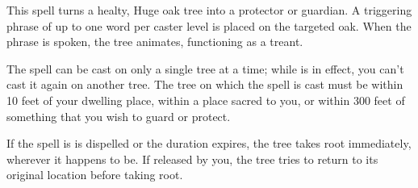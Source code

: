 \begin{spelleffect}
This spell turns a healty, Huge oak tree into a protector or guardian. A triggering phrase of up to one word per caster level is placed on the targeted oak. When the phrase is spoken, the tree animates, functioning as a treant.
\par The spell can be cast on only a single tree at a time; while  is in effect, you can't cast it again on another tree. The tree on which the spell is cast must be within 10 feet of your dwelling place, within a place sacred to you, or within 300 feet of something that you wish to guard or protect.
\end{spelleffect}
\begin{spellnotes}
If the spell is is dispelled or the duration expires, the tree takes root immediately, wherever it happens to be. If released by you, the tree tries to return to its original location before taking root.
\end{spellnotes}

\begin{comment}
\spellsection{Mage's Faithful Hound}
\spellschool{Conjuration (Creation)}
\spellskill{Arcana}
\spelllvl{Arcane 5}
\spelltime{1 minute}
\spellrng{\rngclose}
\spelleff{Phantom watchdog}
\spelldur{24 hours (D) or until discharged, then 1 round/caster level; see text}
\spellsave{None}
\spellsr{No}
\begin{spelleffect}
You conjure up a phantom watchdog that is invisible to everyone but yourself. It then guards the area where it was conjured (it does not move). The hound immediately starts barking loudly if any Small or larger creature approaches within 30 feet of it. (Those within 30 feet of the hound when it is conjured may move about in the area, but if they leave and return, they activate the barking.) The hound sees invisible and ethereal creatures. It does not react to figments, but it does react to shadow illusions.
\par If an intruder approaches to within 5 feet of the hound, the dog stops barking and delivers a vicious bite (\plus10 attack bonus, 2d6\plus3 points of piercing damage) once per round. The dog also gets the bonuses appropriate to an invisible creature.
\par The dog is considered ready to bite intruders, so it delivers its first bite on the intruder's turn. Its bite is the equivalent of a magic weapon for the purpose of damage reduction. The hound cannot be attacked, but it can be dispelled.
\par The spell lasts for 1 hour per caster level, but once the hound begins barking, it lasts only 1 round per caster level. If you are ever more than 100 feet distant from the hound, the spell ends.
\end{spelleffect}
\end{comment}

